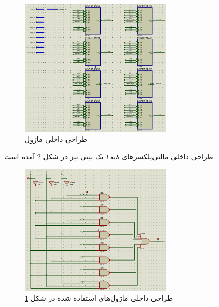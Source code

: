 \documentclass[12pt,onecolumn,a4paper,fleqn]{article}
\begin{document}
	\begin{figure}[H]
		\centering
		\includegraphics[width=0.65\textwidth]{source/multiplexer-in.png}
		\caption{طراحی داخلی ماژول }
		\label{fig:mux8-in}
	\end{figure}
	طراحی داخلی مالتی‌پلکسرهای ۸به۱ یک بیتی نیز در شکل \ref{fig:mux1bit-in} آمده است.
	\begin{figure}[H]
		\centering
		\includegraphics[width=0.65\textwidth]{source/inner-mux.png}
		\caption{طراحی داخلی ماژول‌های  استفاده شده در شکل \ref{fig:mux8-in}}
		\label{fig:mux1bit-in}
	\end{figure}
\end{document}
